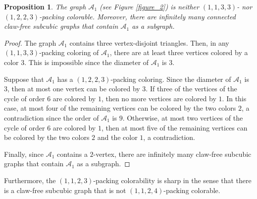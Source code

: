 \documentclass[12pt, oneside]{scrartcl}
\newtheorem{proposition}{Proposition}%
\begin{document}
\begin{proposition}\label{sharp1}
    The graph $\mathcal{A}_1$ (see Figure \ref{figure_2}) is neither $(1,1,3,3)$- nor $(1,2,2,3)$-packing colorable. Moreover, there are infinitely many connected claw-free subcubic graphs that contain $\mathcal{A}_1$ as a subgraph.
\end{proposition}
\begin{proof}
    The graph $\mathcal{A}_1$ contains three vertex-disjoint triangles. Then, in any $(1,1,3,3)$-packing coloring of $\mathcal{A}_1$, there are at least three  vertices colored by a color $3$. This is impossible since the diameter of $\mathcal{A}_1$ is $3$. 

    Suppose that $\mathcal{A}_{1}$ has a $(1,2,2,3)$-packing coloring. Since the diameter of $\mathcal{A}_{1}$ is $3$, then at most one vertex can be colored by $3$. If three of the vertices of the cycle of order $6$ are colored by $1$, then no more vertices are colored by $1$. In this case, at most four of the remaining vertices can be colored by the two colors $2$, a contradiction since the order of $\mathcal{A}_1$ is $9$. Otherwise, at most two vertices of the cycle of order $6$ are colored by $1$, then at most five of the remaining vertices can be colored by the two colors $2$ and the color $1$, a contradiction.

    Finally, since $\mathcal{A}_1$ contains a $2$-vertex, there are infinitely many claw-free subcubic graphs that contain $\mathcal{A}_1$ as a subgraph.
\end{proof}

Furthermore, the $(1,1,2,3)$-packing colorability is sharp in the sense that there is a claw-free subcubic graph that is not $(1,1,2,4)$-packing colorable.
\end{document}
